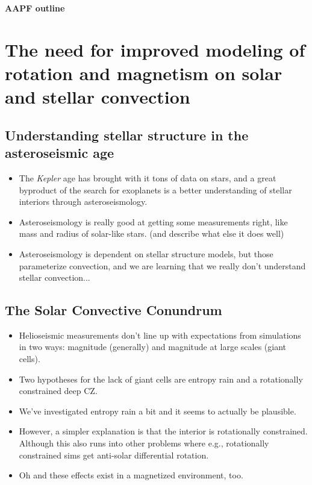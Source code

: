 \documentclass[aasms,12pt]{article}
\begin{document}
\begin{center}
   \large\textbf{AAPF outline}\\
   \vspace{0.2cm}
\end{center}

\vspace{-0.6cm}

\section{The need for improved modeling of rotation and magnetism on solar and stellar convection}
\subsection{Understanding stellar structure in the asteroseismic age}

\begin{itemize}
\item The \emph{Kepler} age has brought with it tons of data on stars, and a great byproduct of the search for exoplanets is a better understanding of stellar interiors through asteroseismology.
\item Asteroseismology is really good at getting some measurements right, like mass and radius of solar-like stars. (and describe what else it does well)
\item Asteroseismology is dependent on stellar structure models, but those parameterize convection, and we are learning that we really don't understand stellar convection...
\end{itemize}

\subsection{The Solar Convective Conundrum}

\begin{itemize}
\item Helioseismic measurements don't line up with expectations from simulations in two ways: magnitude (generally) and magnitude at large scales (giant cells).
\item Two hypotheses for the lack of giant cells are entropy rain and a rotationally constrained deep CZ.
\item We've investigated entropy rain a bit and it seems to actually be plausible.
\item However, a simpler explanation is that the interior is rotationally constrained. Although this also runs into other problems where e.g., rotationally constrained sims get anti-solar differential rotation.
\item Oh and these effects exist in a magnetized environment, too.
\end{itemize}
\end{document}
